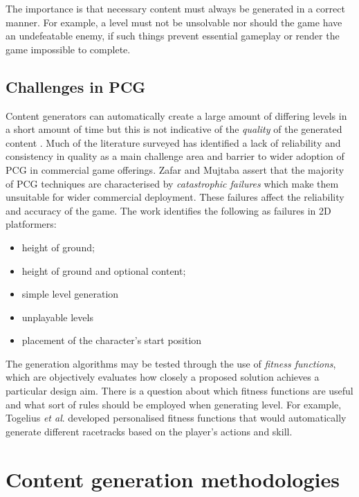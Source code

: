 \documentclass[11pt, a4paper, oneside]{report} %
\begin{document}
The importance is that necessary content must always be generated in a correct manner. For example,
a level must not be unsolvable nor should the game have an undefeatable enemy, if such things
prevent essential gameplay or render the game impossible to complete.

\subsection{Challenges in PCG}

Content generators can automatically create a large amount of differing levels in a short amount of
time but this is not indicative of the \textit{quality} of the generated content
\cite{Smith:2009:RLG:1536513.1536548}. Much of the literature surveyed has identified a lack of
reliability and consistency in quality as a main challenge area and barrier to wider adoption of PCG
in commercial game offerings. Zafar and Mujtaba \cite{6424299} assert that the majority of PCG techniques
are characterised by \textit{catastrophic failures} which make them unsuitable for wider commercial
deployment. These failures affect the reliability and accuracy of the game. The work identifies the
following as failures in 2D platformers:

\begin{itemize}

  \item height of ground; 
  \item height of ground and optional content;      
  \item simple level generation
  \item unplayable levels 
  \item placement of the character's start position 

\end{itemize}

The generation algorithms may be tested through the use of \textit{fitness functions}, which are
objectively evaluates how closely a proposed solution achieves a particular design aim. There is a
question about which fitness functions are useful and what sort of rules should be employed when
generating level. For example, Togelius \textit{et al}. \cite{togelius2007towards} developed
personalised fitness functions that would automatically generate different racetracks based on the
player's actions and skill.


\section{Content generation methodologies}
\end{document}
